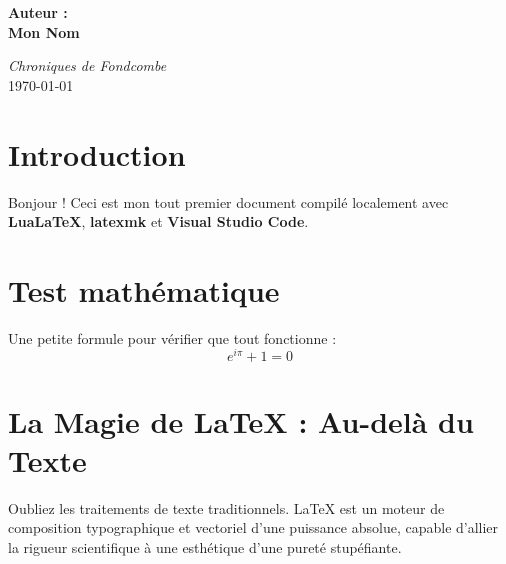 \documentclass[11pt,a4paper]{article}
\begin{document}
\begin{titlepage}
\begin{center}
        {\color{elfgreen}\Large \textbf{Auteur :}}\\[0.2cm]
        {\color{elfgold}\LARGE \textbf{Mon Nom}}\\[3cm]
        
        \vfill
        
        {\color{elfgreen!80}\large \textit{Chroniques de Fondcombe}} \\
        {\color{elfgreen!80}\large \today}
    \end{center}
\end{titlepage}
\pagecolor{white} %

\section{Introduction}
Bonjour ! Ceci est mon tout premier document compilé localement avec \textbf{Lua\LaTeX}, \textbf{latexmk} et \textbf{Visual Studio Code}.

\section{Test mathématique}
Une petite formule pour vérifier que tout fonctionne :
\begin{equation}
    e^{i\pi} + 1 = 0
\end{equation}

\section{La Magie de \LaTeX{} : Au-delà du Texte}

Oubliez les traitements de texte traditionnels. \LaTeX{} est un moteur de composition typographique et vectoriel d'une puissance absolue, capable d'allier la rigueur scientifique à une esthétique d'une pureté stupéfiante.
\end{document}
